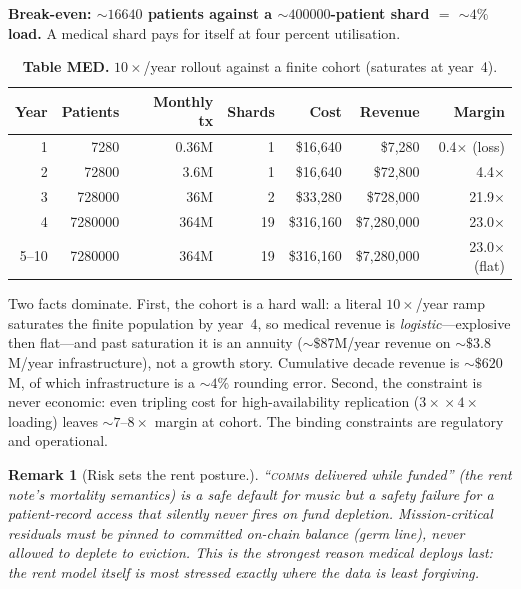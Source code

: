 \documentclass[11pt]{article}
\newtheorem{remark}{Remark}
\begin{document}
\textbf{Break-even: ${\sim}\num{16640}$ patients against a ${\sim}\num{400000}$-patient shard ${=}$ ${\sim}4\%$ load.} A medical shard pays for itself at four percent utilisation.

\begin{table}[h]
\centering
\caption*{\textbf{Table MED.} $10\times$/year rollout against a finite cohort (saturates at year~4).}
\begin{tabular}{@{}rrrrrrr@{}}
\toprule
Year & Patients & Monthly tx & Shards & Cost & Revenue & Margin \\
\midrule
1 & \num{7280}     & 0.36M & 1  & \$16{,}640  & \$7{,}280     & 0.4$\times$ (loss) \\
2 & \num{72800}    & 3.6M  & 1  & \$16{,}640  & \$72{,}800    & 4.4$\times$ \\
3 & \num{728000}   & 36M   & 2  & \$33{,}280  & \$728{,}000   & 21.9$\times$ \\
4 & \num{7280000}  & 364M  & 19 & \$316{,}160 & \$7{,}280{,}000 & 23.0$\times$ \\
\rowcolor{coolrow}5--10 & \num{7280000} & 364M & 19 & \$316{,}160 & \$7{,}280{,}000 & 23.0$\times$ (flat) \\
\bottomrule
\end{tabular}
\end{table}

Two facts dominate. First, the cohort is a hard wall: a literal $10\times$/year ramp saturates the finite population by year~4, so medical revenue is \emph{logistic}---explosive then flat---and past saturation it is an annuity (${\sim}\$87$M/year revenue on ${\sim}\$3.8$M/year infrastructure), not a growth story. Cumulative decade revenue is ${\sim}\$620$M, of which infrastructure is a ${\sim}4\%$ rounding error. Second, the constraint is never economic: even tripling cost for high-availability replication ($3\times\!\times4\times$ loading) leaves ${\sim}7$--$8\times$ margin at cohort. The binding constraints are regulatory and operational.

\begin{remark}[Risk sets the rent posture.]
``\textsc{comm}s delivered while funded'' (the rent note's mortality semantics) is a safe default for music but a safety failure for a patient-record access that silently never fires on fund depletion. Mission-critical residuals must be pinned to committed on-chain balance (germ line), never allowed to deplete to eviction. This is the strongest reason medical deploys last: the rent model itself is most stressed exactly where the data is least forgiving.
\end{remark}
\end{document}
